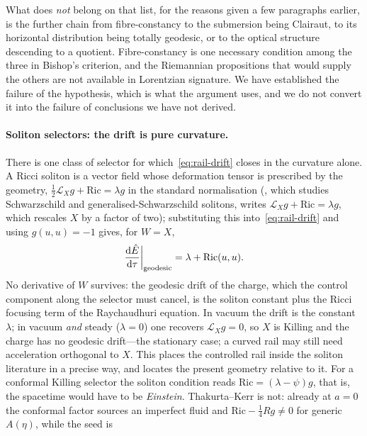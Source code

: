\documentclass[12pt]{iopart}
\theoremstyle{plain}
\theoremstyle{definition}
\theoremstyle{remark}
\newcommand{\Ehat}{\hat E}
\newcommand{\dd}{\mathrm{d}}
\begin{document}
What does \emph{not} belong on that list, for the reasons given a few paragraphs
earlier, is the further chain from fibre-constancy to the submersion being
Clairaut, to its horizontal distribution being totally geodesic, or to the
optical structure descending to a quotient. Fibre-constancy is one necessary
condition among the three in Bishop's criterion, and the Riemannian propositions
that would supply the others are not available in Lorentzian signature. We have
established the failure of the hypothesis, which is what the argument uses, and
we do not convert it into the failure of conclusions we have not derived.

\paragraph{Soliton selectors: the drift is pure curvature.} There is one class of
selector for which~\eqref{eq:rail-drift} closes in the curvature alone. A Ricci
soliton is a vector field whose deformation tensor is prescribed by the geometry,
$\tfrac12\mathcal L_Xg+\mathrm{Ric}=\lambda g$ in the standard normalisation
(\cite{Lecian2025GenSchwarzschild}, which studies Schwarzschild and
generalised-Schwarzschild solitons, writes $\mathcal L_Xg+\mathrm{Ric}=\lambda g$, which
rescales $X$ by a factor of two); substituting this
into~\eqref{eq:rail-drift} and using $g(u,u)=-1$ gives, for $W=X$,
\begin{equation}
    \frac{\dd\Ehat}{\dd\tau}\bigg|_{\rm geodesic}
      =\lambda+\mathrm{Ric}(u,u) .
    \label{eq:soliton-drift}
\end{equation}
No derivative of $W$ survives: the geodesic drift of the charge, which the control
component along the selector must cancel, is the soliton constant plus the Ricci
focusing term of the Raychaudhuri equation. In vacuum the drift is the constant $\lambda$;
in vacuum \emph{and} steady ($\lambda=0$) one recovers $\mathcal L_Xg=0$, so $X$
is Killing and the charge has no geodesic drift---the stationary case; a curved rail may
still need acceleration orthogonal to $X$. This places the
controlled rail inside the soliton literature
\cite{Hamilton1986,Lecian2026Yamabe,Lecian2026Solitons} in a precise way, and
locates the present geometry relative to it. For a conformal Killing selector
the soliton condition reads $\mathrm{Ric}=(\lambda-\psi)g$, that is, the
spacetime would have to be \emph{Einstein}. Thakurta--Kerr is not: already at
$a=0$ the conformal factor sources an imperfect fluid and
$\mathrm{Ric}-\tfrac14Rg\neq0$ for generic $A(\eta)$, while the seed is
\end{document}
